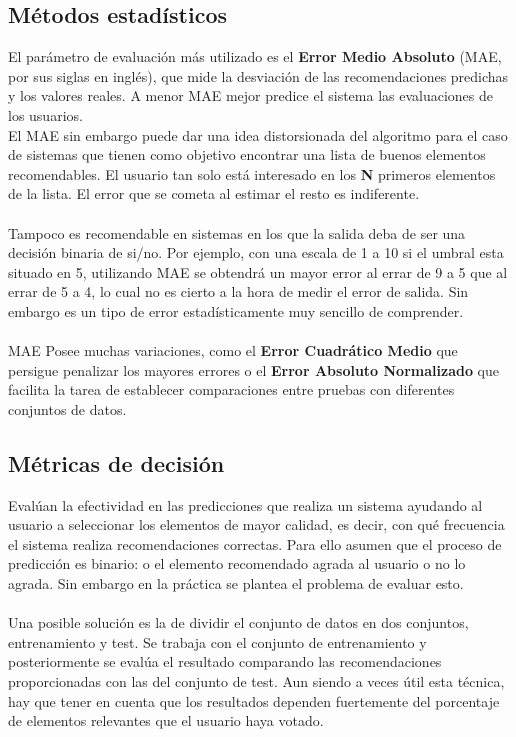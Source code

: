 \documentclass[12pt,letterpaper,oneside] {memoir}
\begin{document}
\subsection{Métodos estadísticos}
El parámetro de evaluación más utilizado es el \textbf{Error Medio Absoluto} (MAE, por sus siglas en inglés), que mide la desviación de las recomendaciones predichas y los valores reales. A menor MAE mejor predice el sistema las evaluaciones de los usuarios. \\
El MAE sin embargo puede dar una idea distorsionada del algoritmo para el caso de sistemas que tienen como objetivo encontrar una lista de buenos elementos recomendables. El usuario tan solo está interesado en los \textbf{N} primeros elementos de la lista. El error que se cometa al estimar el resto es indiferente. 
\paragraph*{}
Tampoco es recomendable en sistemas en los que la salida deba de ser una decisión binaria de si/no. Por ejemplo, con una escala de 1 a 10 si el umbral esta situado en 5, utilizando MAE se obtendrá un mayor error al errar de 9 a 5 que al errar de 5 a 4, lo cual no es cierto a la hora de medir el error de salida. Sin embargo es un tipo de error estadísticamente muy sencillo de comprender. 
\paragraph{}
MAE Posee muchas variaciones, como el \textbf{Error Cuadrático Medio} que persigue penalizar los mayores errores o el \textbf{Error Absoluto Normalizado} que facilita la tarea de establecer comparaciones entre pruebas con diferentes conjuntos de datos.

\subsection{Métricas de decisión}

Evalúan la efectividad en las predicciones que realiza un sistema ayudando al usuario a seleccionar los elementos de mayor calidad, es decir, con qué frecuencia el sistema realiza recomendaciones correctas. Para ello asumen que el proceso de predicción es binario: o el elemento recomendado agrada al usuario o no lo agrada. Sin embargo en la práctica se plantea el problema de evaluar esto. 
\paragraph{}
Una posible solución es la de dividir el conjunto de datos en dos conjuntos, entrenamiento y test. Se trabaja con el conjunto de entrenamiento y posteriormente se evalúa el resultado comparando las recomendaciones proporcionadas con las del conjunto de test. Aun siendo a veces útil esta técnica, hay que tener en cuenta que los resultados dependen fuertemente del porcentaje de elementos relevantes que el usuario haya votado. 
\end{document}
